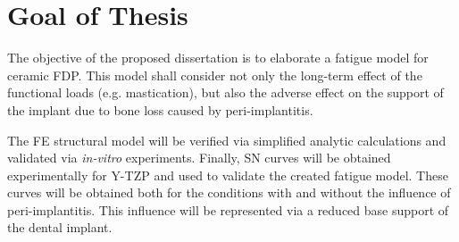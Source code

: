 \section{Goal of Thesis}
\label{sec:goal}


The objective of the proposed dissertation is to elaborate a fatigue model for ceramic \ac{FDP}.
This model shall consider not only the long-term effect of the functional loads (e.g. mastication), but also the adverse effect on the support of the implant due to bone loss caused by peri-implantitis.

The \ac{FE} structural model will be verified via simplified analytic calculations and validated via \emph{in-vitro} experiments. 
Finally, \ac{SN} curves will be obtained experimentally for \ac{Y-TZP} and used to validate the created fatigue model.
These curves will be obtained both for the conditions with and without the influence of peri-implantitis.
This influence will be represented via a reduced base support of the dental implant.



